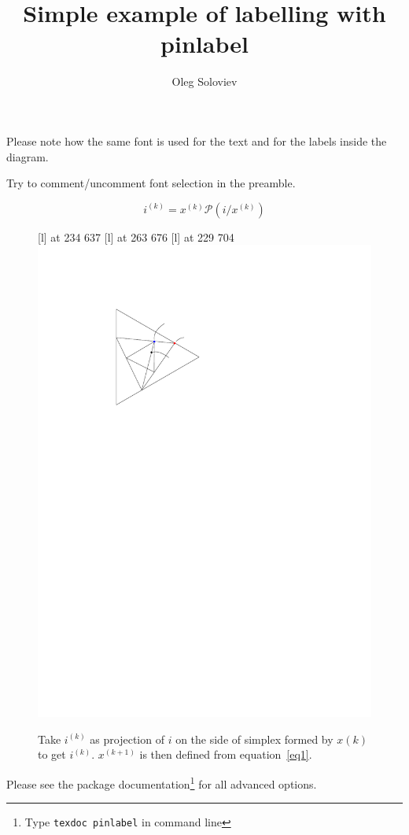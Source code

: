 \documentclass[11pt,a4paper]{article}
\author{Oleg Soloviev}
\title{Simple example of labelling with pinlabel}
\begin{document}
	
	\maketitle
	
	Please note how the same font is used for the text and for the labels inside the diagram. 
	
	Try to comment/uncomment font selection in the preamble.

	
	\begin{equation}\label{eq1}
	i^{(k)}=x^{(k)}\mathcal{P}(i/x^{(k)})
	\end{equation}
	
	\begin{figure}[htb]
		\small\hair 2pt
		 [l] at 234 637
		 [l] at 263 676
		 [l] at 229 704
		\endlabellist
		\centering
		\includegraphics[scale=1.0]{simplex}
		\caption{
			Take $i^{(k)}$ as projection of $i$ on the  side of simplex formed by $x{(k)}$ to get $i^{(k)}$.  $x^{(k+1)}$ is then defined from equation~\eqref{eq1}.
		}
		\label{fig:label}
	\end{figure}



	
	Please see the package documentation\footnote{Type \texttt{texdoc pinlabel} in command line} for all advanced options.
\end{document}
